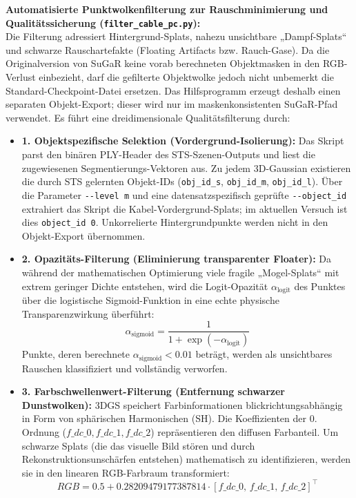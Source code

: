 \documentclass[12pt,a4paper]{article}
\begin{document}
\textbf{Automatisierte Punktwolkenfilterung zur Rauschminimierung und Qualitätssicherung (\texttt{filter\_cable\_pc.py}):}\\
Die Filterung adressiert Hintergrund-Splats, nahezu unsichtbare „Dampf-Splats“ und schwarze Rauschartefakte (Floating Artifacts bzw. Rauch-Gase). Da die Originalversion von SuGaR keine vorab berechneten Objektmasken in den RGB-Verlust einbezieht, darf die gefilterte Objektwolke jedoch nicht unbemerkt die Standard-Checkpoint-Datei ersetzen. Das Hilfsprogramm erzeugt deshalb einen separaten Objekt-Export; dieser wird nur im maskenkonsistenten SuGaR-Pfad verwendet. Es führt eine dreidimensionale Qualitätsfilterung durch:
\begin{itemize}[noitemsep]
    \item \textbf{1. Objektspezifische Selektion (Vordergrund-Isolierung):} Das Skript parst den binären PLY-Header des STS-Szenen-Outputs und liest die zugewiesenen Segmentierungs-Vektoren aus. Zu jedem 3D-Gaussian existieren die durch STS gelernten Objekt-IDs (\texttt{obj\_id\_s}, \texttt{obj\_id\_m}, \texttt{obj\_id\_l}). Über die Parameter \texttt{-{}-level m} und eine datensatzspezifisch geprüfte \texttt{-{}-object\_id} extrahiert das Skript die Kabel-Vordergrund-Splats; im aktuellen Versuch ist dies \texttt{object\_id 0}. Unkorrelierte Hintergrundpunkte werden nicht in den Objekt-Export übernommen.
    \item \textbf{2. Opazitäts-Filterung (Eliminierung transparenter Floater):} Da während der mathematischen Optimierung viele fragile „Mogel-Splats“ mit extrem geringer Dichte entstehen, wird die Logit-Opazität $\alpha_{\text{logit}}$ des Punktes über die logistische Sigmoid-Funktion in eine echte physische Transparenzwirkung überführt:
    \[
    \alpha_{\text{sigmoid}} = \frac{1}{1 + \exp(-\alpha_{\text{logit}})}
    \]
    Punkte, deren berechnete $\alpha_{\text{sigmoid}} < 0.01$ beträgt, werden als unsichtbares Rauschen klassifiziert und vollständig verworfen.
    \item \textbf{3. Farbschwellenwert-Filterung (Entfernung schwarzer Dunstwolken):} 3DGS speichert Farbinformationen blickrichtungsabhängig in Form von sphärischen Harmonischen (SH). Die Koeffizienten der 0. Ordnung ($f\_dc\_0, f\_dc\_1, f\_dc\_2$) repräsentieren den diffusen Farbanteil. Um schwarze Splats (die das visuelle Bild stören und durch Rekonstruktionsunschärfen entstehen) mathematisch zu identifizieren, werden sie in den linearen RGB-Farbraum transformiert:
    \[
    RGB = 0.5 + 0.28209479177387814 \cdot [f\_dc\_0, \, f\_dc\_1, \, f\_dc\_2]^{\top}
\]
\end{itemize}
\end{document}
